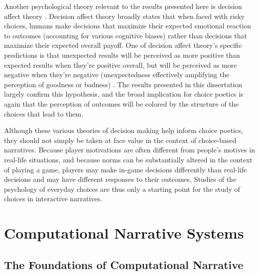 Another psychological theory relevant to the results presented here is decision affect theory \citep{Mellers1997,Mellers1999}.
%
Decision affect theory broadly states that when faced with risky choices, humans make decisions that maximize their expected emotional reaction to outcomes (accounting for various cognitive biases) rather than decisions that maximize their expected overall payoff.
%
One of decision affect theory's specific predictions is that unexpected results will be perceived as more positive than expected results when they're positive overall, but will be perceived as more negative when they're negative (unexpectedness effectively amplifying the perception of goodness or badness) \citep{Shepperd2002}.
%
The results presented in this dissertation largely confirm this hypothesis, and the broad implication for choice poetics is again that the perception of outcomes will be colored by the structure of the choices that lead to them.


Although these various theories of decision making help inform choice poetics, they should not simply be taken at face value in the context of choice-based narratives.
%
Because player motivations are often different from people's motives in real-life situations, and because norms can be substantially altered in the context of playing a game, players may make in-game decisions differently than real-life decisions and may have different responses to their outcomes.
%
Studies of the psychology of everyday choices are thus only a starting point for the study of choices in interactive narratives.



\section{Computational Narrative Systems}

\subsection{The Foundations of Computational Narrative}
\label{sec:compnar-foundations}

